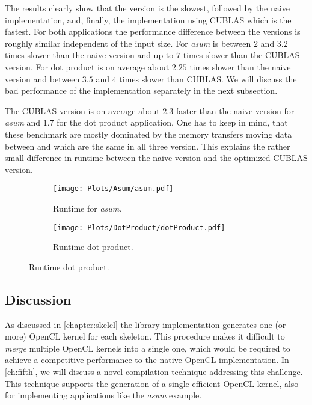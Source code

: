 The results clearly show that the \SkelCL version is the slowest, followed by the naive \OpenCL implementation, and, finally, the implementation using CUBLAS which is the fastest.
For both applications the performance difference between the versions is roughly similar independent of the input size.
For \emph{asum} \SkelCL is between $2$ and $3.2$ times slower than the naive \OpenCL version and up to $7$ times slower than the CUBLAS version.
For dot product \SkelCL is on average about $2.25$ times slower than the naive \OpenCL version and between $3.5$ and $4$ times slower than CUBLAS.
We will discuss the bad performance of the \SkelCL implementation separately in the next subsection.

The CUBLAS version is on average about $2.3$ faster than the naive \OpenCL version for \emph{asum} and $1.7$ for the dot product application.
One has to keep in mind, that these benchmark are mostly dominated by the memory transfers moving data between \CPU and \GPU which are the same in all three version.
This explains the rather small difference in runtime between the naive \OpenCL version and the optimized CUBLAS version.

\begin{figure}[tb]
  \centering
  \begin{subfigure}[t]{.45\textwidth}
    \hspace{-.1\textwidth}\texttt{[image: Plots/Asum/asum.pdf]}
    \caption{Runtime for \emph{asum}.}
    \label{fig:skelcl:asum}
  \end{subfigure}
  \hfill
  \begin{subfigure}[t]{.45\textwidth}
    \hspace{-.1\textwidth}\texttt{[image: Plots/DotProduct/dotProduct.pdf]}
    \caption{Runtime dot product.}
    \label{fig:skelcl:dot}
  \end{subfigure}
\end{figure}

\subsection*{Discussion}
As discussed in \autoref{chapter:skelcl} the \SkelCL library implementation generates one (or more) OpenCL kernel for each skeleton.
This procedure makes it difficult to \emph{merge} multiple OpenCL kernels into a single one, which would be required to achieve a competitive performance to the native OpenCL implementation.
In \autoref{ch:fifth}, we will discuss a novel compilation technique addressing this challenge.
This technique supports the generation of a single efficient OpenCL kernel, also for implementing applications like the \emph{asum} example.

